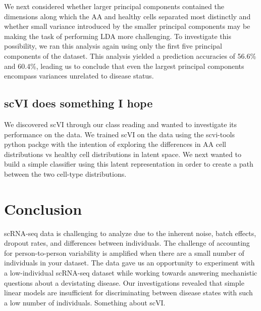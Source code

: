 \documentclass{article}
\begin{document}
We next considered whether larger principal components contained the dimensions along which the AA and healthy cells separated most distinctly and whether small variance introduced by the smaller principal components may be making the task of performing LDA more challenging.
To investigate this possibility, we ran this analysis again using only the first five principal components of the dataset.
This analysis yielded a prediction accuracies of 56.6\% and 60.4\%, leading us to conclude that even the largest principal components encompass variances unrelated to disease status.

\subsection{scVI does something I hope}
We discovered scVI through our class reading and wanted to investigate its performance on the \citet{tonglin_single-cell_2022} data.
We trained scVI on the \citet{tonglin_single-cell_2022} data using the scvi-tools python packge \citep{gayoso_python_2022} with the intention of exploring the differences in AA cell distributions vs healthy cell distributions in latent space.
We next wanted to build a simple classifier using this latent representation in order to create a path between the two cell-type distributions.


\section{Conclusion}
scRNA-seq data is challenging to analyze due to the inherent noise, batch effects, dropout rates, and differences between individuals.
The challenge of accounting for person-to-person variability is amplified when there are a small number of individuals in your dataset.
The \citet{tonglin_single-cell_2022} data gave us an opportunity to experiment with a low-individual scRNA-seq dataset while working towards answering mechanistic questions about a devistating disease.
Our investigations revealed that simple linear models are insufficient for discriminating between disease states with such a low number of individuals.
Something about scVI.


{
\small
\printbibliography
}
\end{document}
